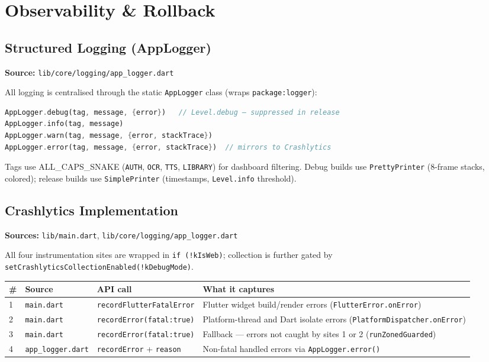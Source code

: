 \documentclass[11pt,a4paper]{article}
\begin{document}
\section{Observability \& Rollback}

\subsection{Structured Logging (AppLogger)}

\textbf{Source:} \texttt{lib/core/logging/app\_logger.dart}

All logging is centralised through the static \texttt{AppLogger} class (wraps
\texttt{package:logger}):

\begin{lstlisting}[language=Dart]
AppLogger.debug(tag, message, {error})   // Level.debug — suppressed in release
AppLogger.info(tag, message)
AppLogger.warn(tag, message, {error, stackTrace})
AppLogger.error(tag, message, {error, stackTrace})  // mirrors to Crashlytics
\end{lstlisting}

Tags use ALL\_CAPS\_SNAKE (\texttt{AUTH}, \texttt{OCR}, \texttt{TTS}, \texttt{LIBRARY})
for dashboard filtering. Debug builds use \texttt{PrettyPrinter} (8-frame stacks,
colored); release builds use \texttt{SimplePrinter} (timestamps, \texttt{Level.info}
threshold).

\subsection{Crashlytics Implementation}

\textbf{Sources:} \texttt{lib/main.dart}, \texttt{lib/core/logging/app\_logger.dart}

All four instrumentation sites are wrapped in \texttt{if (!kIsWeb)};
collection is further gated by
\texttt{setCrashlyticsCollectionEnabled(!kDebugMode)}.

\vspace{4pt}
\begin{tabularx}{\textwidth}{@{}C{0.4cm} L{3.2cm} L{3.2cm} L{6.4cm}@{}}
  \toprule
  \textbf{\#} & \textbf{Source} & \textbf{API call} & \textbf{What it captures} \\
  \midrule
  1 & \texttt{main.dart} & \texttt{recordFlutterFatalError} &
    Flutter widget build/render errors (\texttt{FlutterError.onError}) \\
  2 & \texttt{main.dart} & \texttt{recordError(fatal:true)} &
    Platform-thread and Dart isolate errors (\texttt{PlatformDispatcher.onError}) \\
  3 & \texttt{main.dart} & \texttt{recordError(fatal:true)} &
    Fallback — errors not caught by sites 1 or 2 (\texttt{runZonedGuarded}) \\
  4 & \texttt{app\_logger.dart} & \texttt{recordError} + \texttt{reason} &
    Non-fatal handled errors via \texttt{AppLogger.error()} \\
  \bottomrule
\end{tabularx}
\vspace{2pt}
\end{document}
